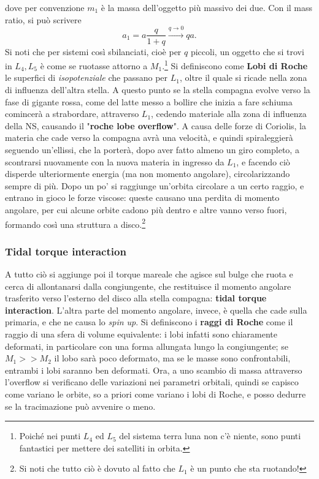 dove per convenzione $m_1$ è la massa dell'oggetto più massivo dei due.
Con il mass ratio, si può scrivere
\begin{equation}
    a_1 = a\frac{q}{1+q}\xrightarrow{q\xrightarrow{}0} qa.
\end{equation}
Si noti che per sistemi così sbilanciati, cioè per $q$ piccoli, un oggetto che si trovi in $L_4,L_5$ è come se ruotasse attorno a $M_1$.\footnote{Poiché nei punti $L_4$ ed $L_5$ del sistema terra luna non c'è niente, sono punti fantastici per mettere dei satelliti in orbita.}
Si definiscono come \textbf{Lobi di Roche} le superfici di \textit{isopotenziale} che passano per $L_1$, oltre il quale si ricade nella zona di influenza dell'altra stella.
A questo punto se la stella compagna evolve verso la fase di gigante rossa, come del latte messo a bollire che inizia a fare schiuma comincerà a strabordare, attraverso $L_1$, cedendo materiale alla zona di influenza della NS, causando il "\textbf{roche lobe overflow}".
A causa delle forze di Coriolis, la materia che cade verso la compagna avrà una velocità, e quindi spiraleggierà seguendo un'ellissi, che la porterà, dopo aver fatto almeno un giro completo, a scontrarsi nuovamente con la nuova materia in ingresso da $L_1$, e facendo ciò disperde ulteriormente energia (ma non momento angolare), circolarizzando sempre di più.
Dopo un po' si raggiunge un'orbita circolare a un certo raggio, e entrano in gioco le forze viscose: queste causano una perdita di momento angolare, per cui alcune orbite cadono più dentro e altre vanno verso fuori, formando così una struttura a disco.\footnote{Si noti che tutto ciò è dovuto al fatto che $L_1$ è un punto che sta ruotando!}

\subsubsection{Tidal torque interaction}
A tutto ciò si aggiunge poi il torque mareale che agisce sul bulge che ruota e cerca di allontanarsi dalla congiungente, che restituisce il momento angolare trasferito verso l'esterno del disco alla stella compagna: \textbf{tidal torque interaction}.
L'altra parte del momento angolare, invece, è quella che cade sulla primaria, e che ne causa lo \textit{spin up}.
Si definiscono i \textbf{raggi di Roche} come il raggio di una sfera di volume equivalente: 
i lobi infatti sono chiaramente deformati, in particolare con una forma allungata lungo la congiungente; se $M_1>>M_2$ il lobo sarà poco deformato, ma se le masse sono confrontabili, entrambi i lobi saranno ben deformati.
Ora, a uno scambio di massa attraverso l'overflow si verificano delle variazioni nei parametri orbitali, quindi se capisco come variano le orbite, so 
a priori come variano i lobi di Roche, e posso dedurre se la tracimazione può avvenire o meno.
